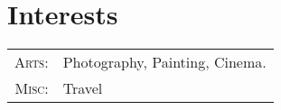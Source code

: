 %
%
%

\section{\texorpdfstring{\color{Blue}Interests}{Interests}}
\begin{tabular}{rl}
   \textsc{Arts:} & Photography, Painting, Cinema. \\ 
    \textsc{Misc:} & Travel
\end{tabular}

